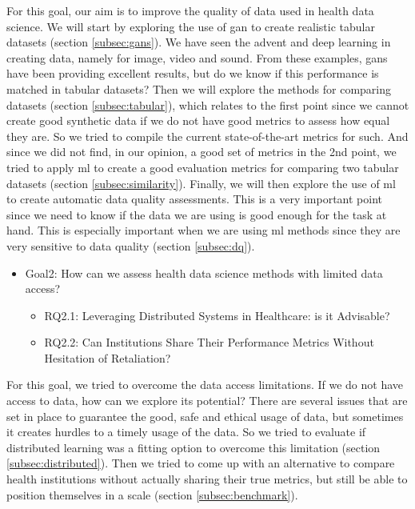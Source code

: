 For this goal, our aim is to improve the quality of data used in health data science. We will start by exploring the use of \ac{gan} to create realistic tabular datasets (section \ref{subsec:gans}). We have seen the advent and deep learning in creating data, namely for image, video and sound. From these examples, \acp{gan} have been providing excellent results, but do we know if this performance is matched in tabular datasets? Then we will explore the methods for comparing datasets (section \ref{subsec:tabular}), which relates to the first point since we cannot create good synthetic data if we do not have good metrics to assess how equal they are. So we tried to compile the current state-of-the-art metrics for such. And since we did not find, in our opinion, a good set of metrics in the 2nd point, we tried to apply \ac{ml} to create a good evaluation metrics for comparing two tabular datasets (section \ref{subsec:similarity}). Finally,  we will then explore the use of \ac{ml} to create automatic data quality assessments. This is a very important point since we need to know if the data we are using is good enough for the task at hand. This is especially important when we are using \ac{ml} methods since they are very sensitive to data quality (section \ref{subsec:dq}).

\begin{itemize}

    \item Goal2: How can we assess health data science methods with limited data access?
    \begin{itemize}
        \item RQ2.1: Leveraging Distributed Systems in Healthcare: is it Advisable?
        \item RQ2.2: Can Institutions Share Their Performance Metrics Without Hesitation of Retaliation?
    \end{itemize}
\end{itemize}

For this goal, we tried to overcome the data access limitations. If we do not have access to data, how can we explore its potential? There are several issues that are set in place to guarantee the good, safe and ethical usage of data, but sometimes it creates hurdles to a timely usage of the data. So we tried to evaluate if distributed learning was a fitting option to overcome this limitation (section \ref{subsec:distributed}). Then we tried to come up with an alternative to compare health institutions without actually sharing their true metrics, but still be able to position themselves in a scale (section \ref{subsec:benchmark}). 

